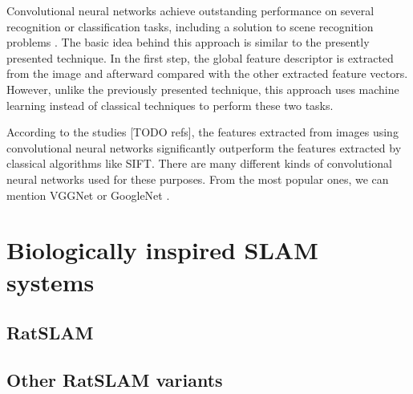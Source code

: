 Convolutional neural networks achieve outstanding performance on several recognition or classification tasks, including a solution to scene recognition problems \parencite{CNNSceneRecognition1} \parencite{CNNSceneRecognition2}. The basic idea behind this approach is similar to the presently presented technique. In the first step, the global feature descriptor is extracted from the image and afterward compared with the other extracted feature vectors. However, unlike the previously presented technique, this approach uses machine learning instead of classical techniques to perform these two tasks.\par
According to the studies [TODO refs], the features extracted from images using convolutional neural networks significantly outperform the features extracted by classical algorithms like SIFT. There are many different kinds of convolutional neural networks used for these purposes. From the most popular ones, we can mention VGGNet \parencite{VggNet} or GoogleNet \parencite{GoogleNet}.

\section{Biologically inspired SLAM systems}\label{section:bioSlam}

\subsection{RatSLAM}\label{section:ratSlamRW}

\subsection{Other RatSLAM variants}\label{section:ratSlamVariants}